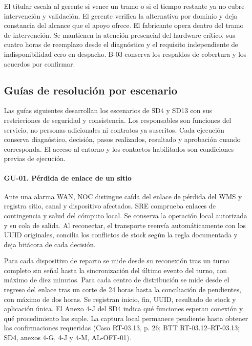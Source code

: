 El titular escala al gerente si vence un tramo o si el tiempo restante ya no cubre intervención y validación. El gerente verifica la alternativa por dominio y deja constancia del alcance que el apoyo ofrece. El fabricante opera dentro del tramo de intervención. Se mantienen la atención presencial del hardware crítico, sus cuatro horas de reemplazo desde el diagnóstico y el requisito independiente de indisponibilidad cero en despacho. B-03 conserva los respaldos de cobertura y los acuerdos por confirmar.

\subsection*{Guías de resolución por escenario}
Las guías siguientes desarrollan los escenarios de SD4 y SD13 con sus restricciones de seguridad y consistencia. Los responsables son funciones del servicio, no personas adicionales ni contratos ya suscritos. Cada ejecución conserva diagnóstico, decisión, pasos realizados, resultado y aprobación cuando corresponda. El acceso al entorno y los contactos habilitados son condiciones previas de ejecución.

\Needspace{0.19\textheight}
\paragraph*{GU-01. Pérdida de enlace de un sitio}
Ante una alarma WAN, NOC distingue caída del enlace de pérdida del WMS y registra sitio, canal y dispositivo afectados. SRE comprueba enlaces de contingencia y salud del cómputo local. Se conserva la operación local autorizada y su cola de salida. Al reconectar, el transporte reenvía automáticamente con los UUID originales, concilia los conflictos de stock según la regla documentada y deja bitácora de cada decisión.

Para cada dispositivo de reparto se mide desde su reconexión tras un turno completo sin señal hasta la sincronización del último evento del turno, con máximo de diez minutos. Para cada centro de distribución se mide desde el regreso del enlace tras un corte de 24 horas hasta la conciliación de pendientes, con máximo de dos horas. Se registran inicio, fin, UUID, resultado de stock y aplicación única. El Anexo 4-J del SD4 indica qué funciones esperan conexión y qué procedimiento las suple. La captura local permanece pendiente hasta obtener las confirmaciones requeridas (Caso RT-03.13, p. 26; BTT RT-03.12--RT-03.13; SD4, anexos 4-G, 4-J y 4-M, AL-OFF-01).

